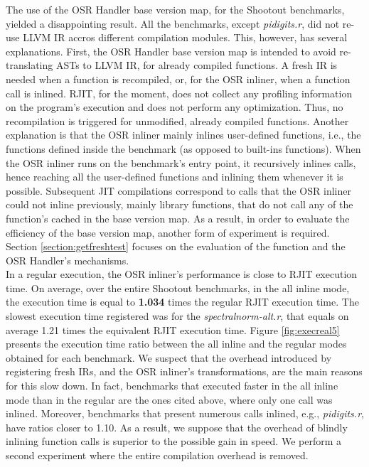 The use of the OSR Handler base version map, for the Shootout benchmarks, yielded a disappointing result.
All the benchmarks, except \textit{pidigits.r}, did not re-use LLVM IR accros different compilation modules.
This, however, has several explanations.
First, the OSR Handler base version map is intended to avoid re-translating ASTs to LLVM IR, for already compiled functions.
A fresh IR is needed when a function is recompiled, or, for the OSR inliner, when a function call is inlined.
RJIT, for the moment, does not collect any profiling information on the program's execution and does not perform any optimization. 
Thus, no recompilation is triggered for unmodified, already compiled functions.
Another explanation is that the OSR inliner mainly inlines user-defined functions, i.e., the functions defined inside the benchmark (as opposed to built-ins functions).
When the OSR inliner runs on the benchmark's entry point, it recursively inlines calls, hence reaching all the user-defined functions and inlining them whenever it is possible.
Subsequent JIT compilations correspond to calls that the OSR inliner could not inline previously, mainly library functions, that do not call any of the function's cached in the base version map.
As a result, in order to evaluate the efficiency of the base version map, another form of experiment is required.
Section \ref{section:getfreshtest} focuses on the evaluation of the  function and the OSR Handler's mechanisms.\\

In a regular execution, the OSR inliner's performance is close to RJIT execution time.
On average, over the entire Shootout benchmarks, in the all inline mode, the execution time is equal to \textbf{1.034} times the regular RJIT execution time.
The slowest execution time registered was for the \textit{spectralnorm-alt.r}, that equals on average 1.21 times the equivalent RJIT execution time.
Figure \ref{fig:execreal5} presents the execution time ratio between the all inline and the regular modes obtained for each benchmark.
We suspect that the overhead introduced by registering fresh IRs, and the OSR inliner's transformations, are the main reasons for this slow down.
In fact, benchmarks that executed faster in the all inline mode than in the regular are the ones cited above, where only one call was inlined.
Moreover, benchmarks that present numerous calls inlined, e.g., \textit{pidigits.r}, have ratios closer to 1.10.
As a result, we suppose that the overhead of blindly inlining function calls is superior to the possible gain in speed. 
We perform a second experiment where the entire compilation overhead is removed.\\

